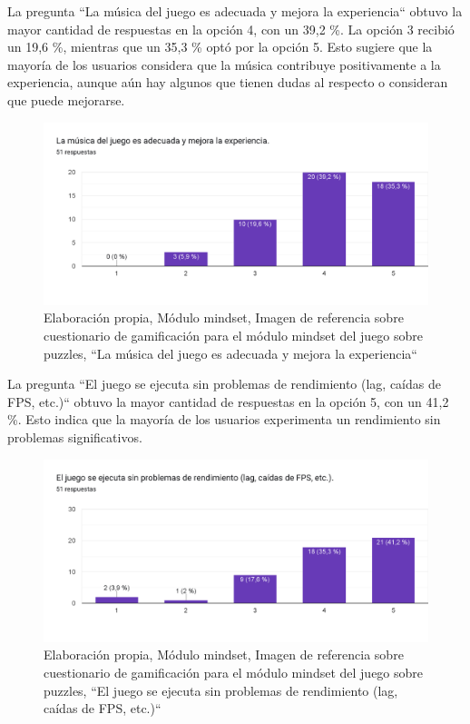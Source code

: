 La pregunta ``La música del juego es adecuada y mejora la experiencia`` obtuvo la mayor cantidad de respuestas en la opción 4, con un 39,2 \%. La opción 3 recibió un 19,6 \%, mientras que un 35,3 \% optó por la opción 5. Esto sugiere que la mayoría de los usuarios considera que la música contribuye positivamente a la experiencia, aunque aún hay algunos que tienen dudas al respecto o consideran que puede mejorarse.

\begin{figure}[H]
  \centering
  \includegraphics[width=0.7\linewidth]{Imagenes/mc5.png}
  \caption{Elaboración propia, Módulo mindset, Imagen de referencia sobre cuestionario de gamificación para el módulo mindset del juego sobre puzzles, ``La música del juego es adecuada y mejora la experiencia``}
  \label{fig:cuestionario5mindset}
\end{figure}



La pregunta ``El juego se ejecuta sin problemas de rendimiento (lag, caídas de FPS, etc.)`` obtuvo la mayor cantidad de respuestas en la opción 5, con un 41,2 \%. Esto indica que la mayoría de los usuarios experimenta un rendimiento sin problemas significativos.

\begin{figure}[H]
  \centering
  \includegraphics[width=0.7\linewidth]{Imagenes/mc6.png}
  \caption{Elaboración propia, Módulo mindset, Imagen de referencia sobre cuestionario de gamificación para el módulo mindset del juego sobre puzzles, ``El juego se ejecuta sin problemas de rendimiento (lag, caídas de FPS, etc.)``}
  \label{fig:cuestionario6mindset}
\end{figure}

